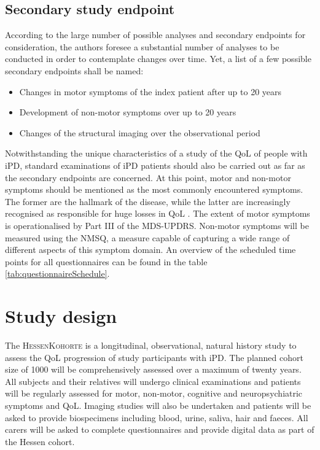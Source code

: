 \subsection{Secondary study endpoint}
According to the large number of possible analyses and secondary endpoints for consideration, the authors foresee a substantial
number of analyses to be conducted in order to contemplate changes over time. Yet, a list of a few possible secondary endpoints shall be named:
\begin{itemize}[noitemsep,topsep=0pt]
  \item{Changes in motor symptoms of the index patient after up to 20 years}
  \item{Development of non-motor symptoms over up to 20 years}
  \item{Changes of the structural imaging over the observational period} 
\end{itemize}
Notwithstanding the unique characteristics of a study of the \ac{QoL} of people with \ac{iPD}, standard examinations of \ac{iPD} patients should also be carried out as far as the secondary endpoints are concerned. At this point, motor and non-motor symptoms should be mentioned as the most commonly encountered symptoms. The former are the hallmark of the disease, while the latter are increasingly recognised as responsible for huge losses in \ac{QoL} \citep{klietz2020qol}. The extent of motor symptoms is operationalised by Part III of the \ac{MDS-UPDRS}\cite{goetz2007updrs}. Non-motor symptoms will be measured using the \ac{NMSQ}, a measure capable of capturing a wide range of different aspects of this symptom domain. An overview of the scheduled time points for all questionnaires can be found in the table \ref{tab:questionnaireSchedule}.

\section{Study design}
The \textsc{HessenKohorte} is a longitudinal, observational, natural history study to assess the \ac{QoL} progression of study participants with \ac{iPD}. The planned cohort size of \num[round-precision = 0, round-mode = places]{1000}{} will be comprehensively assessed over a maximum of twenty years. All subjects and their relatives will undergo clinical examinations and patients will be regularly assessed for motor, non-motor, cognitive and neuropsychiatric symptoms and \ac{QoL}. Imaging studies will also be undertaken and patients will be asked to provide biospecimens including blood, urine, saliva, hair and faeces. All carers will be asked to complete questionnaires and provide digital data as part of the Hessen cohort.

